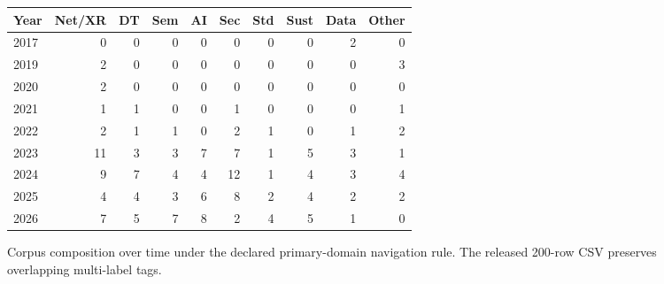 \begin{figure}[H]\centering\scriptsize\begin{tabular}{lrrrrrrrrr}\toprule Year&Net/XR&DT&Sem&AI&Sec&Std&Sust&Data&Other\\\midrule 2017&0&0&0&0&0&0&0&2&0\\ 2019&2&0&0&0&0&0&0&0&3\\ 2020&2&0&0&0&0&0&0&0&0\\ 2021&1&1&0&0&1&0&0&0&1\\ 2022&2&1&1&0&2&1&0&1&2\\ 2023&11&3&3&7&7&1&5&3&1\\ 2024&9&7&4&4&12&1&4&3&4\\ 2025&4&4&3&6&8&2&4&2&2\\ 2026&7&5&7&8&2&4&5&1&0\\\bottomrule\end{tabular}\caption{Corpus composition over time under the declared primary-domain navigation rule. The released 200-row CSV preserves overlapping multi-label tags.}\label{fig:corpuscomposition_source}\end{figure}